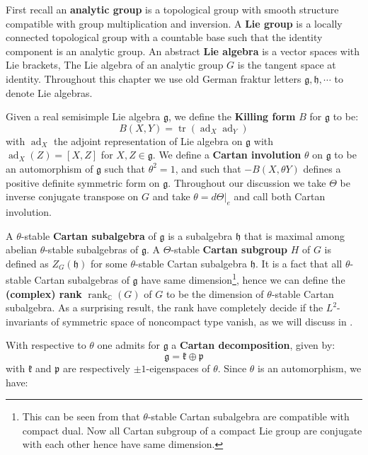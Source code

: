 \documentclass[11pt]{report}
\theoremstyle{definition}
\theoremstyle{plain}
\DeclareMathOperator{\tr}{tr}
\DeclareMathOperator{\ad}{ad}
\DeclareMathOperator{\rk}{rank}
\newcommand{\complex}{\mathbb{C}}
\newcommand{\Lie}[1]{\mathfrak{#1}}
\begin{document}
\par First recall an \textbf{analytic group} is a topological group with smooth structure compatible with group multiplication and inversion. A \textbf{Lie group} is a locally connected topological group with a countable base such that the identity component is an analytic group. An abstract \textbf{Lie algebra} is a vector spaces with Lie brackets, The Lie algebra of an analytic group $G$ is the tangent space at identity. Throughout this chapter we use old German fraktur letters $\Lie{g}, \Lie{h}, \cdots$ to denote Lie algebras. 
\par Given a real semisimple Lie algebra $\Lie{g}$, we define the \textbf{Killing form} $B$ for $\Lie{g}$ to be:
\begin{equation}
B(X, Y)=\tr(\ad_X\ad_Y)
\end{equation}
with $\ad_X$ the adjoint representation of Lie algebra on $\Lie{g}$ with $\ad_X(Z)=[X, Z]$ for $X, Z\in \Lie{g}$. We define a \textbf{Cartan involution} $\theta$ on $\Lie{g}$ to be an automorphism of $\Lie{g}$ such that $\theta^2=1$, and such that $-B(X, \theta Y)$ defines a positive definite symmetric form on $\Lie{g}$. Throughout our discussion we take $\Theta$ be inverse conjugate transpose on $G$ and take $\theta=d\Theta|_e$ and call both Cartan involution.
\par A $\theta$-stable \textbf{Cartan subalgebra} of $\Lie{g}$ is a subalgebra $\Lie{h}$ that is maximal among abelian $\theta$-stable subalgebras of $\Lie{g}$. A $\Theta$-stable \textbf{Cartan subgroup} $H$ of $G$ is defined as $Z_G(\Lie{h})$ for some $\theta$-stable Cartan subalgebra $\Lie{h}$. It is a fact that all $\theta$-stable Cartan subalgebras of $\Lie{g}$ have same dimension\footnote{This can be seen from that $\theta$-stable Cartan subalgebra are compatible with compact dual. Now all Cartan subgroup of a compact Lie group are conjugate with each other hence have same dimension. }, hence we can define the \textbf{(complex) rank} $\rk_\complex(G)$ of $G$ to be the dimension of $\theta$-stable Cartan subalgebra. As a surprising result, the rank have completely decide if the $L^2$-invariants of symmetric space of noncompact type vanish, as we will discuss in .
\par With respective to $\theta$ one admits for $\Lie{g}$ a \textbf{Cartan decomposition}, given by:
\begin{equation}
\Lie{g}=\Lie{k}\oplus \Lie{p}
\end{equation}
with $\Lie{k}$ and $\Lie{p}$ are respectively $\pm 1$-eigenspaces of $\theta$. Since $\theta$ is an automorphism, we have:
\end{document}
